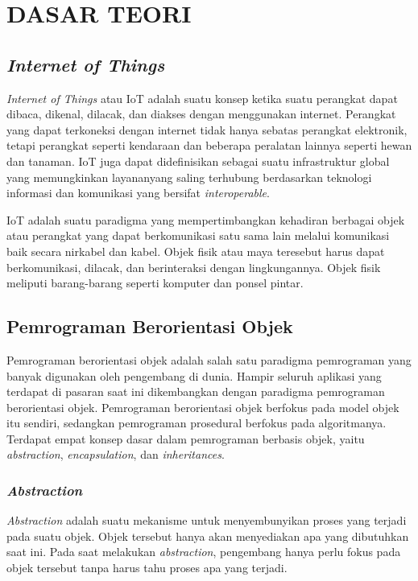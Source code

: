 
\chapter{DASAR TEORI}

\section{\textit{Internet of Things}}
\textit{Internet of Things} atau IoT adalah suatu konsep ketika suatu perangkat dapat dibaca, dikenal, dilacak, dan diakses dengan menggunakan internet. Perangkat yang dapat terkoneksi dengan internet tidak hanya sebatas perangkat elektronik, tetapi perangkat seperti kendaraan dan beberapa peralatan lainnya seperti hewan dan tanaman. IoT juga dapat didefinisikan sebagai suatu infrastruktur global yang memungkinkan layananyang saling terhubung berdasarkan teknologi informasi dan komunikasi yang bersifat \textit{interoperable}. 

IoT adalah suatu paradigma yang mempertimbangkan kehadiran berbagai objek atau perangkat yang dapat berkomunikasi satu sama lain melalui komunikasi baik secara nirkabel dan kabel. Objek fisik atau maya teresebut harus dapat berkomunikasi, dilacak, dan berinteraksi dengan lingkungannya. Objek fisik meliputi barang-barang seperti komputer dan ponsel pintar.


\section{Pemrograman Berorientasi Objek}
Pemrograman berorientasi objek adalah salah satu paradigma pemrograman yang banyak digunakan oleh pengembang di dunia. Hampir seluruh aplikasi yang terdapat di pasaran saat ini dikembangkan dengan paradigma pemrograman berorientasi objek. Pemrograman berorientasi objek berfokus pada model objek itu sendiri, sedangkan pemrograman prosedural berfokus pada algoritmanya. Terdapat empat konsep dasar dalam pemrograman berbasis objek, yaitu \textit{abstraction}, \textit{encapsulation}, dan \textit{inheritances}.

	\subsection{\textit{Abstraction}}
	\textit{Abstraction} adalah suatu mekanisme untuk menyembunyikan proses yang terjadi pada suatu objek. Objek tersebut hanya akan menyediakan apa yang dibutuhkan saat ini. Pada saat melakukan \textit{abstraction}, pengembang hanya perlu fokus pada objek tersebut tanpa harus tahu proses apa yang terjadi.

